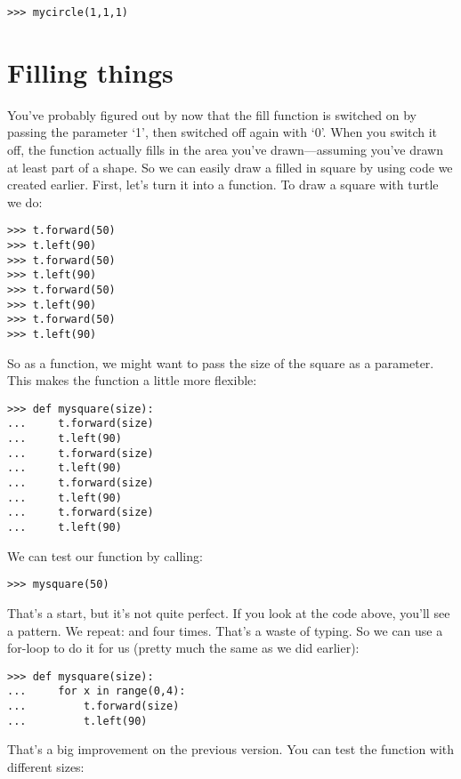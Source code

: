 \begin{Verbatim}[frame=single]
>>> mycircle(1,1,1)
\end{Verbatim}

\section{Filling things}

You've probably figured out by now that the fill function is switched on by passing the parameter `1', then switched off again with `0'. When you switch it off, the function actually fills in the area you've drawn---assuming you've drawn at least part of a shape. So we can easily draw a filled in square by using code we created earlier. First, let's turn it into a function. To draw a square with turtle we do:

\begin{Verbatim}[frame=single]
>>> t.forward(50)
>>> t.left(90)
>>> t.forward(50)
>>> t.left(90)
>>> t.forward(50)
>>> t.left(90)
>>> t.forward(50)
>>> t.left(90)
\end{Verbatim}

So as a function, we might want to pass the size of the square as a parameter.  This makes the function a little more flexible:

\begin{Verbatim}[frame=single]
>>> def mysquare(size):
...     t.forward(size)
...     t.left(90)
...     t.forward(size)
...     t.left(90)
...     t.forward(size)
...     t.left(90)
...     t.forward(size)
...     t.left(90)
\end{Verbatim}

\noindent
We can test our function by calling:

\begin{Verbatim}[frame=single]
>>> mysquare(50)
\end{Verbatim}

That's a start, but it's not quite perfect.  If you look at the code above, you'll see a pattern.  We repeat:  and  four times.  That's a waste of typing.  So we can use a for-loop to do it for us (pretty much the same as we did earlier):

\begin{Verbatim}[frame=single]
>>> def mysquare(size):
...     for x in range(0,4):
...         t.forward(size)
...         t.left(90)
\end{Verbatim}

That's a big improvement on the previous version. You can test the function with different sizes:


